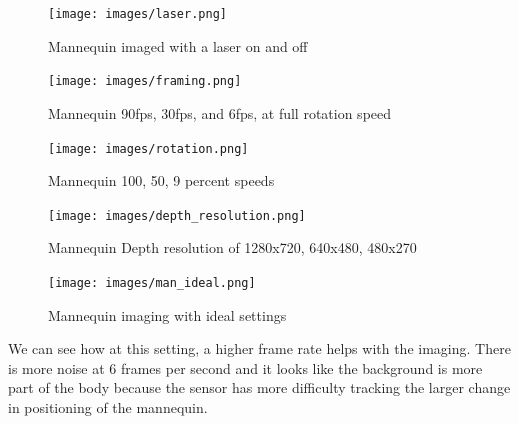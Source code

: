 \begin{figure}[!htb]
	\caption{Mannequin imaged with a laser on and off}
	\centering
	\texttt{[image: images/laser.png]}
\end{figure}


\begin{figure}[!htb]
	\caption{Mannequin 90fps, 30fps, and 6fps, at full rotation speed}
	\centering
	\texttt{[image: images/framing.png]}
\end{figure}


\begin{figure}[!htb]
	\caption{Mannequin 100, 50, 9 percent speeds}
	\centering
	\texttt{[image: images/rotation.png]}
\end{figure}

\begin{figure}[!htb]
	\caption{Mannequin Depth resolution of 1280x720, 640x480, 480x270}
	\centering
	\texttt{[image: images/depth\_resolution.png]}
\end{figure}

\begin{figure}[!htb]
	\caption{Mannequin imaging with ideal settings}
	\centering
	\texttt{[image: images/man\_ideal.png]}
\end{figure}



We can see how at this setting, a higher frame rate helps with the imaging. There is more noise at 6 frames per second and it looks like the background is more part of the body because the sensor has more difficulty tracking the larger change in positioning of the mannequin.

